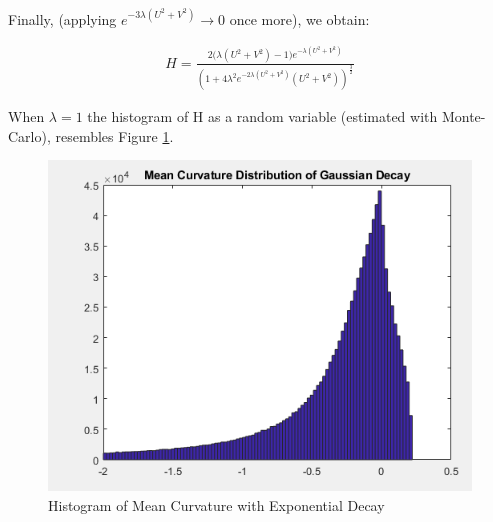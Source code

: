 \documentclass[preprint,12pt]{elsarticle}
\begin{document}
Finally, (applying $e^{-3\lambda(U^2 + V^2)} \to 0$ once more), we obtain:

\begin{gather}
	H = \frac{2\big(\lambda(U^2 + V^2) - 1 \big)e^{-\lambda(U^2 + V^2)}}{(1 + 4\lambda^{2} e^{-2\lambda(U^2 + V^2)}(U^2 + V^2))^{\frac{3}{2}}}
\end{gather}

When $\lambda = 1$ the histogram of H as a random variable (estimated with Monte-Carlo), resembles Figure \ref{fig:gaussian_decay_distribution}.

\begin{figure}
\includegraphics[width=15cm]{gaussian_decay_distribution}
\caption{Histogram of Mean Curvature with Exponential Decay}
\label{fig:gaussian_decay_distribution}
\end{figure}













\end{document}
